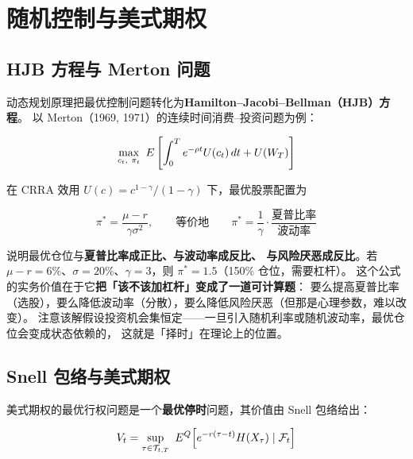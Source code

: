 \section{随机控制与美式期权}

\subsection{HJB 方程与 Merton 问题}

动态规划原理把最优控制问题转化为\textbf{Hamilton--Jacobi--Bellman（HJB）方程}。
以 Merton（1969, 1971）的连续时间消费--投资问题为例：

\begin{equation}
  \max_{c_t,\ \pi_t}\ \E\left[\int_0^{T}\ee^{-\rho t}U(c_t)\,\dd t+U(W_T)\right]
  \label{eq:10-merton}
\end{equation}

在 CRRA 效用 $U(c)=c^{1-\gamma}/(1-\gamma)$ 下，最优股票配置为

\begin{equation}
  \pi^{*} = \frac{\mu-r}{\gamma\sigma^{2}},
  \qquad \text{等价地}\qquad
  \pi^{*} = \frac{1}{\gamma}\cdot\frac{\text{夏普比率}}{\text{波动率}}
  \label{eq:10-merton-ratio}
\end{equation}

\begin{intuitionbox}
 说明最优仓位与\textbf{夏普比率成正比、与波动率成反比、
与风险厌恶成反比}。若 $\mu-r=6\%$、$\sigma=20\%$、$\gamma=3$，则 $\pi^{*}=1.5$（150\% 仓位，需要杠杆）。
这个公式的实务价值在于它\textbf{把「该不该加杠杆」变成了一道可计算题}：
要么提高夏普比率（选股），要么降低波动率（分散），要么降低风险厌恶（但那是心理参数，难以改变）。
注意该解假设投资机会集恒定——一旦引入随机利率或随机波动率，最优仓位会变成状态依赖的，
这就是「择时」在理论上的位置。
\end{intuitionbox}

\subsection{Snell 包络与美式期权}

美式期权的最优行权问题是一个\textbf{最优停时}问题，其价值由 Snell 包络给出：

\begin{equation}
  V_t = \sup_{\tau\in\mathcal{T}_{t,T}}\ \E^{\Qm}\!\left[\ee^{-r(\tau-t)}H(X_\tau)\mid\Fm_t\right]
  \label{eq:10-snell}
\end{equation}

